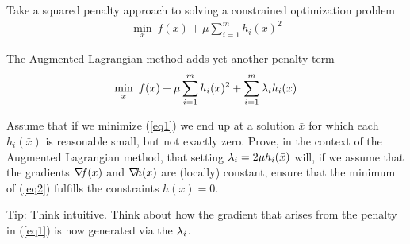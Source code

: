 

\renewcommand{\course}{Optimization}
\renewcommand{\coursepicture}{optim}
\renewcommand{\coursedate}{Summer 2015}
\renewcommand{\exnum}{5}

\exercises



Take a squared penalty approach to solving a constrained optimization problem
\begin{align}
\min_x~ f(x) + \mu \sum_{i=1}^m h_i(x)^2 \label{eq1}
\end{align}

The Augmented Lagrangian method adds yet another penalty term
\begin{align}
\min_x~ f(x) + \mu \sum_{i=1}^m h_i(x)^2 + \sum_{i=1}^m \lambda_i h_i(x)\label{eq2}
\end{align}

Assume that if we minimize (\ref{eq1}) we end up at a solution $\bar{x}$ for
which each $h_i(\bar{x})$ is reasonable small, but not exactly zero.  Prove, in
the context of the Augmented Lagrangian method, that setting $\lambda_i = 2\mu
h_i(\bar{x})$ will, if we assume that the gradients ${\nabla_{\!\!}} f(x)$ and ${\nabla_{\!\!}} h(x)$
are (locally) constant, ensure that the minimum of (\ref{eq2}) fulfills
the constraints $h(x)=0$.

Tip: Think intuitive. Think about how the gradient that arises from
the penalty in (\ref{eq1}) is now generated via the $\lambda_i$.






